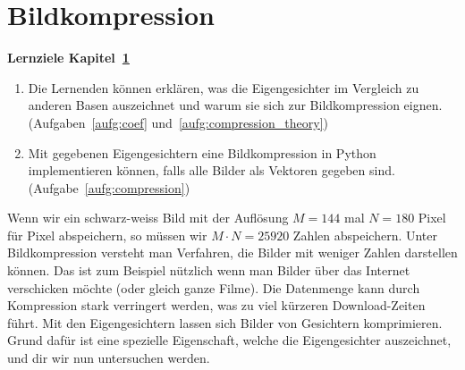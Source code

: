 \section{Bildkompression} \label{sec:compression}
\begin{tcolorbox}
	\centerline{\textbf{Lernziele Kapitel~\ref{sec:compression}}}
	\begin{enumerate}[leftmargin=*,label=\thesection.\arabic*]
		\item \label{item:compression_theory} Die Lernenden können erklären, was die Eigengesichter im Vergleich zu anderen Basen auszeichnet und warum sie sich zur Bildkompression eignen.\\
		(Aufgaben~\ref{aufg:coef} und~\ref{aufg:compression_theory})
		\item \label{item:compression_code} Mit gegebenen Eigengesichtern eine Bildkompression in Python implementieren können, falls alle Bilder als Vektoren gegeben sind.\\
		(Aufgabe~\ref{aufg:compression})
	\end{enumerate}
\end{tcolorbox}
Wenn wir ein schwarz-weiss Bild mit der Auflösung $M=144$ mal $N=180$ Pixel für Pixel abspeichern, so müssen wir $M\cdot N=25920$ Zahlen abspeichern.
Unter Bildkompression versteht man Verfahren, die Bilder mit weniger Zahlen darstellen können.
Das ist zum Beispiel nützlich wenn man Bilder über das Internet verschicken möchte (oder gleich ganze Filme).
Die Datenmenge kann durch Kompression stark verringert werden, was zu viel kürzeren Download-Zeiten führt.
Mit den Eigengesichtern lassen sich Bilder von Gesichtern komprimieren.
Grund dafür ist eine spezielle Eigenschaft, welche die Eigengesichter auszeichnet, und dir wir nun untersuchen werden.

